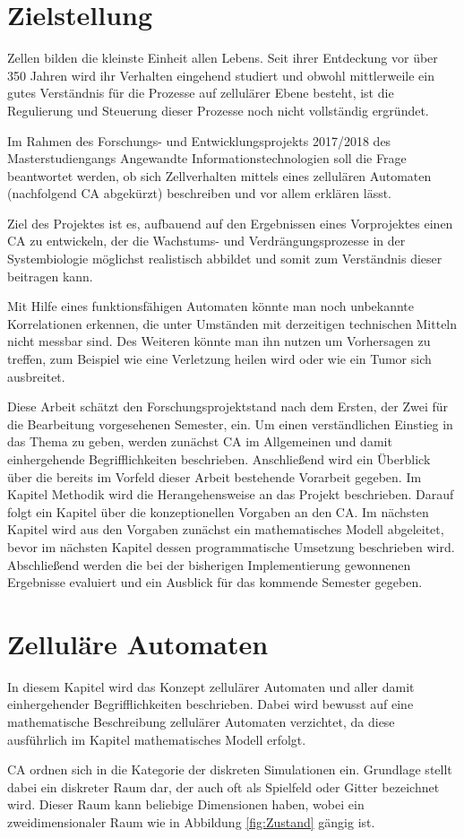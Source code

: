 \documentclass[11pt,a4paper,pointlessnumbers]{scrreprt}  %
\begin{document}
\chapter{Zielstellung}
Zellen bilden die kleinste Einheit allen Lebens. Seit ihrer Entdeckung vor über 350 Jahren wird ihr Verhalten eingehend studiert und obwohl mittlerweile ein gutes Verständnis für die Prozesse auf zellulärer Ebene besteht, ist die Regulierung und Steuerung dieser Prozesse noch nicht vollständig ergründet. \par
Im Rahmen des Forschungs- und Entwicklungsprojekts 2017/2018 des Masterstudiengangs Angewandte Informationstechnologien soll die Frage beantwortet werden, ob sich Zellverhalten mittels eines zellulären Automaten (nachfolgend CA abgekürzt) beschreiben und vor allem erklären lässt. \par
Ziel des Projektes ist es, aufbauend auf den Ergebnissen eines Vorprojektes einen CA zu entwickeln, der die Wachstums- und Verdrängungsprozesse in der Systembiologie möglichst realistisch abbildet und somit zum Verständnis dieser beitragen kann.\par 
Mit Hilfe eines funktionsfähigen Automaten könnte man noch unbekannte Korrelationen erkennen, die unter Umständen mit derzeitigen technischen Mitteln nicht messbar sind. Des Weiteren könnte man ihn nutzen um Vorhersagen zu treffen, zum Beispiel wie eine Verletzung heilen wird oder wie ein Tumor sich ausbreitet.\par
Diese Arbeit schätzt den Forschungsprojektstand nach dem Ersten, der Zwei für die Bearbeitung vorgesehenen Semester, ein. Um einen verständlichen Einstieg in das Thema zu geben, werden zunächst CA im Allgemeinen und damit einhergehende Begrifflichkeiten beschrieben. Anschließend wird ein Überblick über die bereits im Vorfeld dieser Arbeit bestehende Vorarbeit gegeben. Im Kapitel Methodik wird die Herangehensweise an das Projekt beschrieben. Darauf folgt ein Kapitel über die konzeptionellen Vorgaben an den CA. Im nächsten Kapitel wird aus den Vorgaben zunächst ein mathematisches Modell abgeleitet, bevor im nächsten Kapitel dessen programmatische Umsetzung beschrieben wird. Abschließend werden die bei der bisherigen Implementierung gewonnenen Ergebnisse evaluiert und ein Ausblick für das kommende Semester gegeben.
 
\chapter{Zelluläre Automaten}
In diesem Kapitel wird das Konzept zellulärer Automaten und aller damit einhergehender Begrifflichkeiten beschrieben.
Dabei wird bewusst auf eine mathematische Beschreibung zellulärer Automaten verzichtet, da diese ausführlich im Kapitel mathematisches Modell erfolgt. \par
CA ordnen sich in die Kategorie der diskreten Simulationen ein. Grundlage stellt dabei ein diskreter Raum dar, der auch oft als Spielfeld oder Gitter bezeichnet wird. Dieser Raum kann beliebige Dimensionen haben, wobei ein zweidimensionaler Raum wie in Abbildung \ref{fig:Zustand} gängig ist. 
\end{document}
